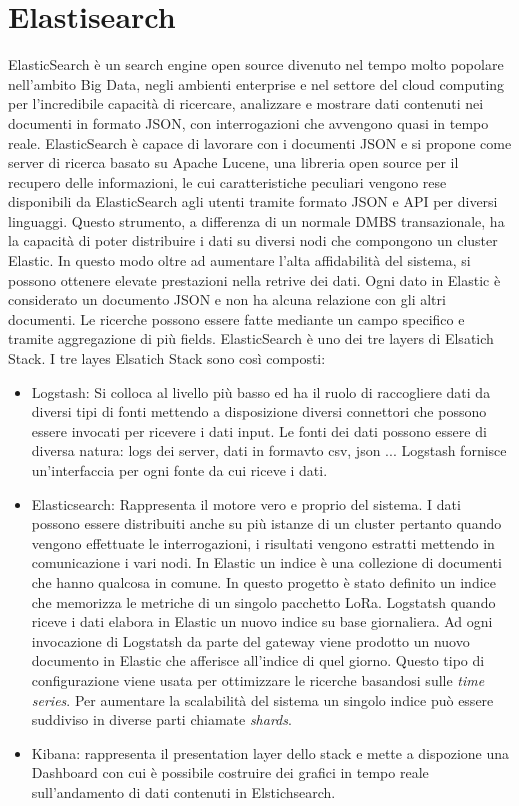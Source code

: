 \documentclass[12pt,a4paper,openright,twoside]{report}
\begin{document}
\section{Elastisearch}
ElasticSearch \`e un search engine open source divenuto nel tempo molto popolare nell'ambito Big Data, negli ambienti enterprise e nel settore del cloud computing per l'incredibile capacit\`a di ricercare, analizzare e mostrare dati contenuti nei documenti in formato JSON, con interrogazioni che avvengono quasi in tempo reale.
ElasticSearch \`e capace di lavorare con i documenti JSON e si propone come server di ricerca basato su Apache Lucene, una libreria open source per il recupero delle informazioni, le cui caratteristiche peculiari vengono rese disponibili da ElasticSearch agli utenti tramite formato JSON e API per diversi linguaggi.
Questo strumento, a differenza di un normale DMBS transazionale, ha la capacit\`a di poter distribuire i dati su diversi nodi che compongono un cluster Elastic. In questo modo oltre ad aumentare l'alta affidabilit\`a del sistema, si possono ottenere elevate prestazioni nella retrive dei dati.
Ogni dato in Elastic \`e considerato un documento JSON e non ha alcuna relazione con gli altri documenti. Le ricerche possono essere fatte mediante un campo specifico e tramite aggregazione di pi\`u fields.
ElasticSearch \`e uno dei tre layers di Elsatich Stack. I tre layes Elsatich Stack sono cos\`i composti:
\begin{itemize}                       
\item Logstash: Si colloca al livello pi\`u basso ed ha il ruolo di raccogliere dati da diversi tipi di fonti mettendo a disposizione diversi connettori che possono essere invocati per ricevere i dati input. Le fonti dei dati possono essere di diversa natura: logs dei server, dati in formavto csv, json ... Logstash fornisce un'interfaccia per ogni fonte da cui riceve i dati. 
\item Elasticsearch: Rappresenta il motore vero e proprio del sistema. I dati possono essere distribuiti anche su pi\`u istanze di un cluster pertanto quando vengono effettuate le interrogazioni, i risultati vengono estratti mettendo in comunicazione i vari nodi. In Elastic un indice \`e una collezione di documenti che hanno qualcosa in comune. In questo progetto \`e stato definito un indice che memorizza le metriche di un singolo pacchetto LoRa. Logstatsh quando riceve i dati elabora in Elastic un nuovo indice su base giornaliera. Ad ogni invocazione di Logstatsh da parte del gateway viene prodotto un nuovo documento in Elastic che afferisce all'indice di quel giorno. Questo tipo di configurazione viene usata per ottimizzare le ricerche basandosi sulle \textit{time series}.
Per aumentare la scalabilit\`a del sistema un singolo indice pu\`o essere suddiviso in diverse parti chiamate \textit{shards}.
\item Kibana: rappresenta il presentation layer dello stack e mette a dispozione una Dashboard con cui \`e possibile costruire dei grafici in tempo reale sull'andamento di dati contenuti in Elstichsearch.
\end{itemize}
\end{document}
